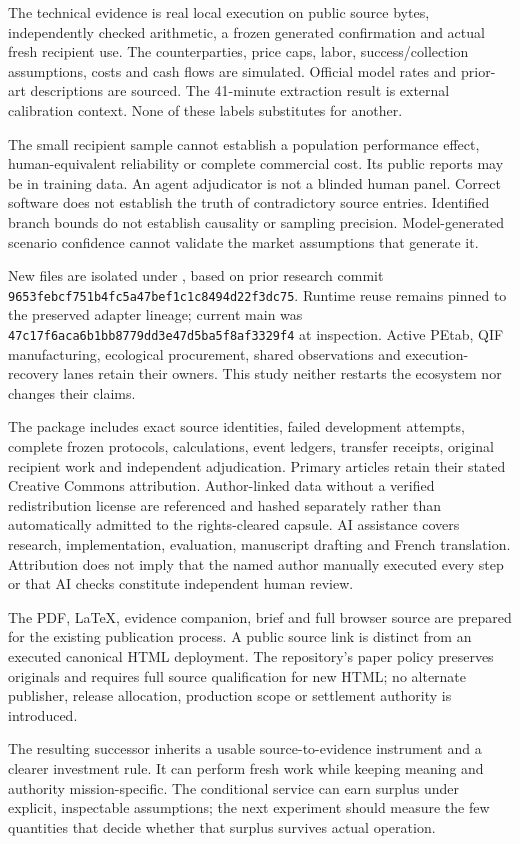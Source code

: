 The technical evidence is real local execution on public source bytes, independently checked arithmetic, a frozen generated confirmation and actual fresh recipient use. The counterparties, price caps, labor, success/collection assumptions, costs and cash flows are simulated. Official model rates and prior-art descriptions are sourced. The 41-minute extraction result is external calibration context. None of these labels substitutes for another.

The small recipient sample cannot establish a population performance effect, human-equivalent reliability or complete commercial cost. Its public reports may be in training data. An agent adjudicator is not a blinded human panel. Correct software does not establish the truth of contradictory source entries. Identified branch bounds do not establish causality or sampling precision. Model-generated scenario confidence cannot validate the market assumptions that generate it.

New files are isolated under , based on prior research commit \nolinkurl{9653febcf751b4fc5a47bef1c1c8494d22f3dc75}. Runtime reuse remains pinned to the preserved adapter lineage; current main was \nolinkurl{47c17f6aca6b1bb8779dd3e47d5ba5f8af3329f4} at inspection. Active PEtab, QIF manufacturing, ecological procurement, shared observations and execution-recovery lanes retain their owners. This study neither restarts the ecosystem nor changes their claims.

The package includes exact source identities, failed development attempts, complete frozen protocols, calculations, event ledgers, transfer receipts, original recipient work and independent adjudication. Primary articles retain their stated Creative Commons attribution. Author-linked data without a verified redistribution license are referenced and hashed separately rather than automatically admitted to the rights-cleared capsule. AI assistance covers research, implementation, evaluation, manuscript drafting and French translation. Attribution does not imply that the named author manually executed every step or that AI checks constitute independent human review.

The PDF, LaTeX, evidence companion, brief and full browser source are prepared for the existing publication process. A public source link is distinct from an executed canonical HTML deployment. The repository's paper policy preserves originals and requires full source qualification for new HTML; no alternate publisher, release allocation, production scope or settlement authority is introduced.\citep{paperpolicy}

The resulting successor inherits a usable source-to-evidence instrument and a clearer investment rule. It can perform fresh work while keeping meaning and authority mission-specific. The conditional service can earn surplus under explicit, inspectable assumptions; the next experiment should measure the few quantities that decide whether that surplus survives actual operation.
